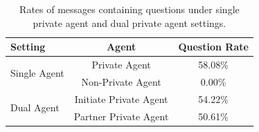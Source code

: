 \begin{table}[H]
\centering
\small
\begin{tabular}{lcc}
\toprule
\textbf{Setting} & \textbf{Agent} & \textbf{Question Rate} \\
\midrule
\multirow{2}{*}{Single Agent} 
 & Private Agent & 58.08\% \\
 & Non-Private Agent & 0.00\% \\
\midrule
\multirow{2}{*}{Dual Agent} 
 & Initiate Private Agent & 54.22\% \\
 & Partner Private Agent & 50.61\% \\
\bottomrule
\end{tabular}
\caption{Rates of messages containing questions under single private agent and dual private agent settings.}
\label{tab:privacy_success}
\end{table}
